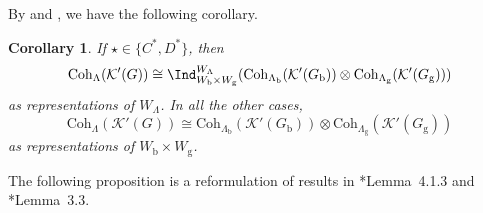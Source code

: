\documentclass[12pt]{amsart}
\newcommand{\CK}{{\mathcal {K}}}
\numberwithin{equation}{section}
\newtheorem{cor}[thm]{Corollary}
\theoremstyle{remark}
\def\Coh{\mathrm{Coh}}
\begin{document}
By  and  , we have the following corollary.

\begin{cor}\label{cor:Ind.DCstar}
 If $\star\in \{C^*, D^*\}$, then
\[
 \Coh_{\Lambda}(\CK'(G))\cong \Ind^{W_\Lambda}_{W_\mathrm b\times W_\mathrm g} (\Coh_{\Lambda_\mathrm b}(\CK'(G_\mathrm b))\otimes \Coh_{\Lambda_\mathrm g}(\CK'(G_\mathrm g)))
 \]
 as representations of $W_\Lambda$. In all the other cases,
\[
 \Coh_{\Lambda}(\CK'(G))\cong \Coh_{\Lambda_\mathrm b}(\CK'(G_\mathrm b))\otimes \Coh_{\Lambda_\mathrm g}(\CK'(G_\mathrm g))
 \]
 as representations of $W_\mathrm b\times W_\mathrm g$.
\end{cor}




The following proposition is a reformulation of results
in \cite{Mat96}*{Lemma~4.1.3} and \cite{GI}*{Lemma~3.3}.
\end{document}
